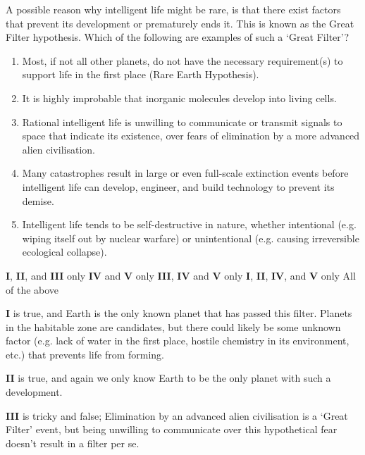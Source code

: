 \documentclass[a4paper,11pt]{exam}
\begin{document}
\begin{questions}
\filbreak
\question
	A possible reason why intelligent life might be rare, is that there exist factors that prevent its development or prematurely ends it. This is known as the Great Filter hypothesis. Which of the following are examples of such a ‘Great Filter’?
	\begin{enumerate}[align=left,labelsep=0pt,leftmargin=0pt,labelsep=3pt,itemindent=23pt,parsep=6pt,label=\textbf{\Roman{*}}.]
		\item Most, if not all other planets, do not have the necessary requirement(s) to support life in the first \hspace*{20pt} place (Rare Earth Hypothesis).
		\item It is highly improbable that inorganic molecules develop into living cells.
		\item Rational intelligent life is unwilling to communicate or transmit signals to space that indicate its \hspace*{20pt} existence, over fears of elimination by a more advanced alien civilisation.
		\item Many catastrophes result in large or even full-scale extinction events before intelligent life can \hspace*{20pt} develop, engineer, and build technology to prevent its demise.
		\item Intelligent life tends to be self-destructive in nature, whether intentional (e.g. wiping itself out by \hspace*{20pt} nuclear warfare) or unintentional (e.g. causing irreversible ecological collapse).
	\end{enumerate}
	\begin{choices}
		\choice \textbf{I}, \textbf{II}, and \textbf{III} only
		\choice \textbf{IV} and \textbf{V} only
		\choice \textbf{III}, \textbf{IV} and \textbf{V} only
		\correctchoice \textbf{I}, \textbf{II}, \textbf{IV}, and \textbf{V} only
		\choice All of the above
	\end{choices}
	\begin{solution}
		\textbf{I} is true, and Earth is the only known planet that has passed this filter. Planets in the habitable zone are candidates, but there could likely be some unknown factor (e.g. lack of water in the first place, hostile chemistry in its environment, etc.) that prevents life from forming.

		\textbf{II} is true, and again we only know Earth to be the only planet with such a development.

		\textbf{III} is tricky and false; Elimination by an advanced alien civilisation is a ‘Great Filter’ event, but being unwilling to communicate over this hypothetical fear doesn’t result in a filter per se.


\end{solution}
\end{questions}
\end{document}
